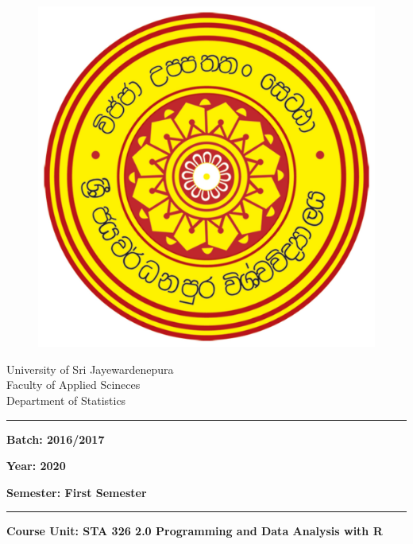 \documentclass[a4paper,12pt]{article}
\begin{document}
\begin{figure}[ht]
	\begin{center}
		\includegraphics[angle=0,scale=0.05]{SJPLogo.jpg}
	\end{center}
\end{figure}

\vspace{-1cm}

\begin{center}
	University of Sri Jayewardenepura\\
	Faculty of Applied Scineces \\
	Department of Statistics
\end{center}


\noindent\rule{17cm}{0.4pt} 	%

\begin{multicols}{3}
	\noindent\textbf{Batch: 2016/2017}
	
	\columnbreak
	\noindent\textbf{Year: 2020 }
	
	\columnbreak
	\noindent\textbf{Semester: First Semester}
	
\end{multicols}

\noindent\rule{17cm}{0.4pt}	%

\vspace{0.5cm}
\noindent\textbf{Course Unit: STA 326 2.0 Programming and Data Analysis with R}\\
\end{document}
